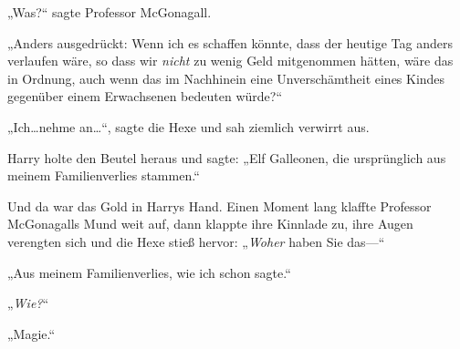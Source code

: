 „Was?“ sagte Professor McGonagall.

„Anders ausgedrückt: Wenn ich es schaffen könnte, dass der heutige Tag anders verlaufen wäre, so dass wir \emph{nicht} zu wenig Geld mitgenommen hätten, wäre das in Ordnung, auch wenn das im Nachhinein eine Unverschämtheit eines Kindes gegenüber einem Erwachsenen bedeuten würde?“

„Ich…nehme an…“, sagte die Hexe und sah ziemlich verwirrt aus.

Harry holte den Beutel heraus und sagte: „Elf Galleonen, die ursprünglich aus meinem Familienverlies stammen.“

Und da war das Gold in Harrys Hand. Einen Moment lang klaffte Professor McGonagalls Mund weit auf, dann klappte ihre Kinnlade zu, ihre Augen verengten sich und die Hexe stieß hervor: „\emph{Woher} haben Sie das—“




„Aus meinem Familienverlies, wie ich schon sagte.“

„\emph{Wie?}“

„Magie.“

